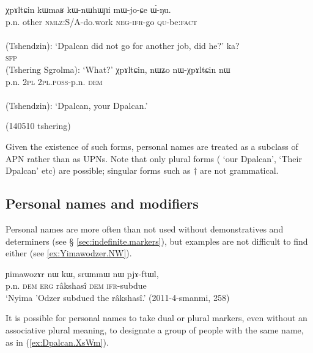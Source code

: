 \begin{exe}
\ex   
\begin{xlist}
\ex 
\gll χpɤltɕin kɯmaʁ kɯ-nɯhɯɲi mɯ-jo-ɕe ɯ́-ŋu. \\
p.n. other \textsc{nmlz}:S/A-do.work \textsc{neg}-\textsc{ifr}-go \textsc{qu}-be:\textsc{fact} \\
\\
\glt (Tshendzin): `Dpalcan did not go for another job, did he?'
\ex 
\gll ka? \\
\textsc{sfp} \\
\glt  (Tshering Sgrolma): `What?'
\ex  \label{ex:nWχpAltCin}
\gll χpɤltɕin, nɯʑo nɯ-χpɤltɕin nɯ \\
p.n. \textsc{2pl} \textsc{2pl}.\textsc{poss}-p.n. \textsc{dem} \\
\\
\glt (Tshendzin): `Dpalcan, your Dpalcan.'  
\end{xlist}
\glt  (140510 tshering)
\end{exe}

Given the existence of such forms, personal names are treated as a subclass of APN rather than as UPNs. Note that only plural forms ( `our Dpalcan',  `Their Dpalcan' etc) are possible; singular forms such as $\dagger$ are not grammatical.
 
\subsection{Personal names and modifiers} \label{sec:personal.names.modifiers}
Personal names are more often than not used without demonstratives and determiners (see § \ref{sec:indefinite.markers}), but examples are not difficult to find either (see \ref{ex:Yimawodzer.NW}).

\begin{exe}
\ex \label{ex:Yimawodzer.NW}
 \gll  ɲimawozɤr nɯ kɯ, srɯnmɯ nɯ pjɤ-ftɯl, \\
 p.n. \textsc{dem} \textsc{erg} râkshasî \textsc{dem} \textsc{ifr}-subdue \\
 \glt `Nyima 'Odzer subdued the râkshasî.' (2011-4-smanmi, 258)
\end{exe}

It is possible for personal names to take dual or plural markers, even without an associative plural meaning, to designate a group of people with the same name, as in (\ref{ex:Dpalcan.XsWm}).

